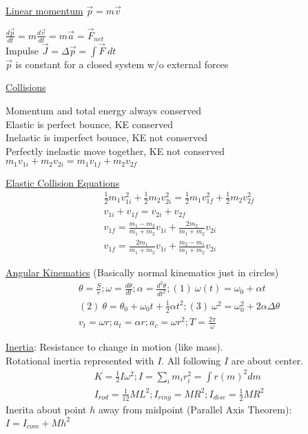 \documentclass[8pt]{minimal}
\begin{document}
\underline{Linear momentum} $\vec{p} = m\vec{v}$

$\frac{d\vec{p}}{dt} = m\frac{d\vec{v}}{dt} = m\vec{a} = \vec{F}_{net}$\\
Impulse $\vec{J} = \Delta \vec{p} = \int \vec{F}\ dt$\\
$\vec{p}$ is constant for a closed system w/o external forces

\underline{Collisions}

Momentum and total energy always conserved\\
Elastic is perfect bounce, KE conserved\\
Inelastic is imperfect bounce, KE not conserved\\
Perfectly inelastic move together, KE not conserved
$m_1v_{1i} + m_2v_{2i} = m_1v_{1f} + m_2v_{2f}$

\pagebreak
\underline{Elastic Collision Equations}
\begin{gather*}
    \frac{1}{2}m_1v_{1i}^2 + \frac{1}{2}m_2v_{2i}^2 = \frac{1}{2}m_1v_{1f}^2 + \frac{1}{2}m_2v_{2f}^2\\
    v_{1i} + v_{1f} = v_{2i} + v_{2f}\\
    v_{1f} = \frac{m_1 - m_2}{m_1 + m_2}v_{1i} + \frac{2m_2}{m_1 + m_2}v_{2i}\\
    v_{1f} = \frac{2m_1}{m_1 + m_2}v_{1i} + \frac{m_2 - m_1}{m_1 + m_2}v_{2i}
\end{gather*}

\underline{Angular Kinematics}
(Basically normal kinematics just in circles)
\begin{gather*}
    \theta = \frac{S}{r}; \omega = \frac{d\theta}{dt}; \alpha = \frac{d^2\theta}{dt^2}; (1)\ \omega(t) = \omega_0 + \alpha t\\
    (2)\ \theta = \theta_0 + \omega_0t + \frac{1}{2}\alpha t^2; (3)\ \omega^2 = \omega_0^2 + 2\alpha\Delta\theta\\
    v_t = \omega r; a_t = \alpha r; a_c = \omega r^2; T = \frac{2 \pi}{\omega}
\end{gather*}

\underline{Inertia}:
Resistance to change in motion (like mass).\\
Rotational inertia represented with $I$. All following $I$ are about center.
\begin{gather*}
    K = \frac{1}{2}I\omega^2; I = \sum_{i} m_i r_i^2 = \int r(m)^2 dm\\
    I_{rod} = \frac{1}{12}ML^2; I_{ring} = MR^2; I_{disc} = \frac{1}{2}MR^2
\end{gather*}
Inerita about point $h$ away from midpoint (Parallel Axis Theorem): \(I = I_{com} + Mh^2\)
\end{document}
